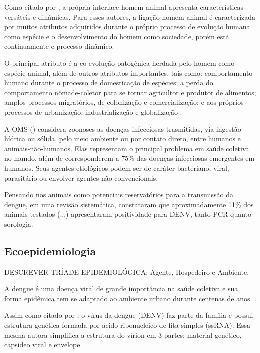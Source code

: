\indent Como citado por , a própria interface homem-animal apresenta características versáteis e dinâmicas. Para esses autores, a ligação homem-animal é caracterizada por muitos atributos adquiridos durante o próprio processo de evolução humana como espécie e o desenvolvimento do homem como sociedade, porém está continuamente e processo dinâmico.

\indent O principal atributo é a co-evolução patogênica herdada pelo homem como espécie animal, além de outros atributos importantes, tais como: comportamento humano durante o processo de domesticação de espécies; a perda do comportamento nômade-coletor para se tornar agricultor e produtor de alimentos; amplos processos migratórios, de colonização e comercialização;  e aos próprios processos de urbanização, industrialização e globalização \cite{HumanAnimalInterface}.

\indent A \acrshort{OMS} (\citeyear{WHO2020Zoonoses}) considera zoonoses as doenças infecciosas trasmitidas, via ingestão hídrica ou sólida, pelo meio ambiente ou por contato direto, entre humanos e animais-não-humanos. Elas representam o principal problema em saúde coletiva no mundo, além de corresponderem a 75\% das doenças infecciosas emergentes em humanos. Seus agentes etiológicos podem ser de caráter bacteriano, viral, parasitário ou envolver agentes não convencionais.


\indent Pensando nos animais como potenciais reservatórios para a transmissão da dengue,  em uma revisão sistemática, constataram que aproximadamente 11\% dos animais testados (...) apresentaram positividade para DENV, tanto PCR quanto sorologia.


\subsection{Ecoepidemiologia}

\indent DESCREVER TRÍADE EPIDEMIOLÓGICA: Agente, Hospedeiro e Ambiente.


\indent A dengue é uma doença viral de grande importância na saúde coletiva e sua forma epidêmica tem se adaptado ao ambiente urbano durante centenas de anos. \cite{ArboviralTransmission}.

\indent Assim como citado por , o vírus da dengue (\acrfull{DENV}) faz parte da família  e possui estrutura genética formada por ácido ribonucleico de fita simples (\acrfull{ssRNA}). Essa mesma autora simplifica a estrutura do vírion em 3 partes: material genético, capsídeo viral e envelope.

